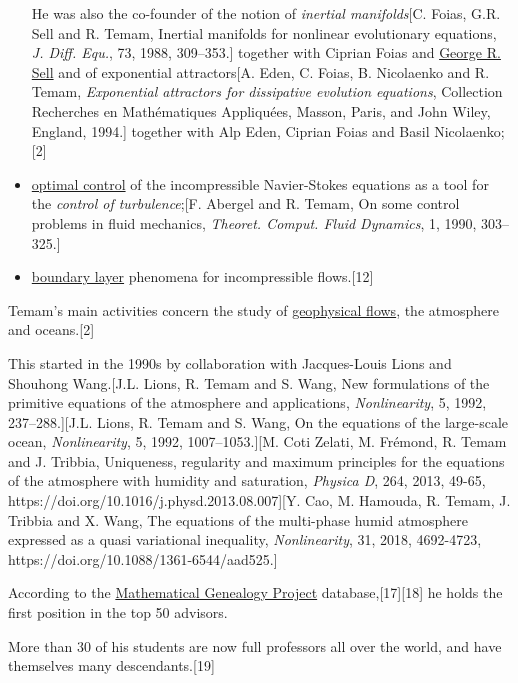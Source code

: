 \documentclass{article}
\begin{document}
\begin{itemize}
	He was also the co-founder of the notion of \textit{inertial manifolds}[C. Foias, G.R. Sell and R. Temam, Inertial manifolds for nonlinear evolutionary equations, \textit{J. Diff. Equ.}, 73, 1988, 309--353.] together with Ciprian Foias and \href{https://en.wikipedia.org/wiki/George_R._Sell}{George R. Sell} and of exponential attractors[A. Eden, C. Foias, B. Nicolaenko and R. Temam, \textit{Exponential attractors for dissipative evolution equations}, Collection Recherches en Mathématiques Appliquées, Masson, Paris, and John Wiley, England, 1994.] together with Alp Eden, Ciprian Foias and Basil Nicolaenko;[2]
	\item \href{https://en.wikipedia.org/wiki/Optimal_control}{optimal control} of the incompressible Navier-Stokes equations as a tool for the \textit{control of turbulence};[F. Abergel and R. Temam, On some control problems in fluid mechanics, \textit{Theoret. Comput. Fluid Dynamics}, 1, 1990, 303--325.]
	\item \href{https://en.wikipedia.org/wiki/Boundary_layer}{boundary layer} phenomena for incompressible flows.[12]
\end{itemize}
Temam's main activities concern the study of \href{https://en.wikipedia.org/wiki/Geophysical_fluid_dynamics}{geophysical flows}, the atmosphere and oceans.[2]

This started in the 1990s by collaboration with Jacques-Louis Lions and Shouhong Wang.[J.L. Lions, R. Temam and S. Wang, New formulations of the primitive equations of the atmosphere and applications, \textit{Nonlinearity}, 5, 1992, 237--288.][J.L. Lions, R. Temam and S. Wang, On the equations of the large-scale ocean, \textit{Nonlinearity}, 5, 1992, 1007--1053.][M. Coti Zelati, M. Frémond, R. Temam and J. Tribbia, Uniqueness, regularity and maximum principles for the equations of the atmosphere with humidity and saturation, \textit{Physica D}, 264, 2013, 49-65, https://doi.org/10.1016/j.physd.2013.08.007][Y. Cao, M. Hamouda, R. Temam, J. Tribbia and X. Wang, The equations of the multi-phase humid atmosphere expressed as a quasi variational inequality, \textit{Nonlinearity}, 31, 2018, 4692-4723, https://doi.org/10.1088/1361-6544/aad525.]

%
According to the \href{https://en.wikipedia.org/wiki/Mathematical_Genealogy_Project}{Mathematical Genealogy Project} database,[17][18] he holds the first position in the top 50 advisors.

More than 30 of his students are now full professors all over the world, and have themselves many descendants.[19]
\end{document}
